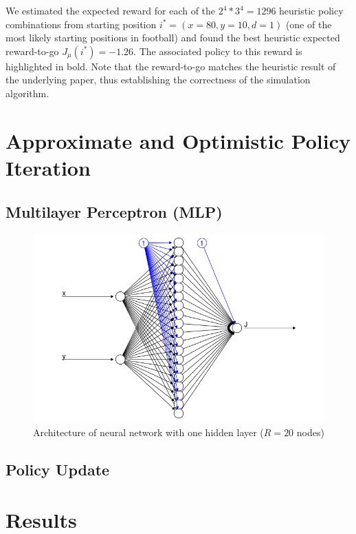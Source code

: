 \documentclass[11pt, oneside]{article}   	%
\begin{document}
We estimated the expected reward for each of the $2^4*3^4 = 1296$ heuristic policy combinations from starting position $i^* = (x=80, y=10, d=1)$ (one of the most likely starting positions in football) and found the best heuristic expected reward-to-go $J_{\mu}(i^*) = -1.26$. The associated policy to this reward is highlighted in bold. Note that the reward-to-go matches the heuristic result of the underlying paper, thus establishing the correctness of the simulation algorithm.

\section{Approximate and Optimistic Policy Iteration}



\subsection{Multilayer Perceptron (MLP)}

\begin{figure}[ht!]
\centering
\includegraphics[width=155mm]{../images/neuralnet.png}
\caption{Architecture of neural network with one hidden layer ($R=20$ nodes)}
\end{figure}

\subsection{Policy Update}

\section{Results}
\end{document}
